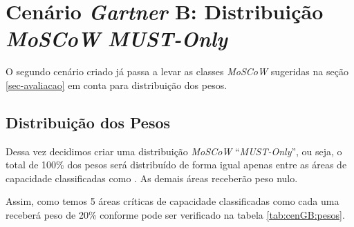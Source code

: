 \newcommand{\cenGB}{Cenário \emph{Gartner} B: Distribuição \emph{MoSCoW} \emph{MUST-Only}} 
\section{\cenGB}

    O segundo cenário criado já passa a levar as classes \emph{MoSCoW} sugeridas na seção \ref{sec-avaliacao} em conta para distribuição dos pesos.
    
\subsection*{Distribuição dos Pesos}    


    Dessa vez decidimos criar uma distribuição \emph{MoSCoW} ``\emph{MUST-Only}'', ou seja, o total de 100\% dos pesos será distribuído de forma igual apenas entre as áreas de capacidade classificadas como \MUST. As demais áreas receberão peso nulo.
    
    Assim, como temos 5 áreas críticas de capacidade classificadas como \MUST cada uma receberá peso de 20\% conforme pode ser verificado na tabela \ref{tab:cenGB:pesos}.
    
